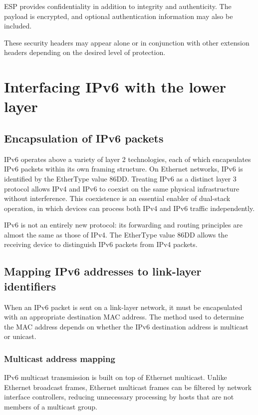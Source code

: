 ESP provides confidentiality in addition to integrity and authenticity. The payload is encrypted, and optional authentication information may also be included.

These security headers may appear alone or in conjunction with other extension headers depending on the desired level of protection.

\section{Interfacing IPv6 with the lower layer}

\subsection{Encapsulation of IPv6 packets}

IPv6 operates above a variety of layer 2 technologies, each of which encapsulates IPv6 packets within its own framing structure. On Ethernet networks, IPv6 is identified by the EtherType value 86DD. Treating IPv6 as a distinct layer 3 protocol allows IPv4 and IPv6 to coexist on the same physical infrastructure without interference. This coexistence is an essential enabler of dual-stack operation, in which devices can process both IPv4 and IPv6 traffic independently.

IPv6 is not an entirely new protocol: its forwarding and routing principles are
almost the same as those of IPv4. The EtherType value 86DD allows the receiving
device to distinguish IPv6 packets from IPv4 packets.

\subsection{Mapping IPv6 addresses to link-layer identifiers}

When an IPv6 packet is sent on a link-layer network, it must be encapsulated with an appropriate destination MAC address. The method used to determine the MAC address depends on whether the IPv6 destination address is multicast or unicast.

\subsubsection*{Multicast address mapping}

IPv6 multicast transmission is built on top of Ethernet multicast. Unlike Ethernet broadcast frames, Ethernet multicast frames can be filtered by network interface controllers, reducing unnecessary processing by hosts that are not members of a multicast group.

